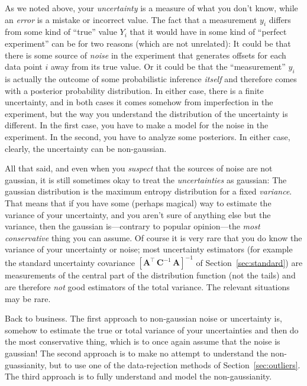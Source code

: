 \documentclass[12pt,twoside]{article}
\newcommand{\sectionname}{Section}
\newcommand{\mmatrix}[1]{\boldsymbol{#1}}
\newcommand{\inverse}[1]{{#1}^{-1}}
\newcommand{\transpose}[1]{{#1}^{\scriptscriptstyle \top}}
\newcommand{\mA}{\mmatrix{A}}
\newcommand{\mAT}{\transpose{\mA}}
\newcommand{\mC}{\mmatrix{C}}
\newcommand{\mCinv}{\inverse{\mC}}
\begin{document}
As we noted above, your \emph{uncertainty} is a measure of what you
don't know, while an \emph{error} is a mistake or incorrect value.
The fact that a measurement $y_i$ differs from some kind of ``true''
value $Y_i$ that it would have in some kind of ``perfect experiment''
can be for two reasons (which are not unrelated): It could be that
there is some source of \emph{noise} in the experiment that generates
offsets for each data point $i$ away from its true value.  Or it could
be that the ``measurement'' $y_i$ is actually the outcome of some
probabilistic inference \emph{itself} and therefore comes with a
posterior probability distribution.  In either case, there is a finite
uncertainty, and in both cases it comes somehow from imperfection in
the experiment, but the way you understand the distribution of the
uncertainty is different.  In the first case, you have to make a model
for the noise in the experiment.  In the second, you have to analyze
some posteriors.  In either case, clearly, the uncertainty can be
non-gaussian.

All that said, and even when you \emph{suspect} that the sources of
noise are not gaussian, it is still sometimes okay to treat the
\emph{uncertainties} as gaussian: The gaussian distribution is the
maximum entropy distribution for a fixed \emph{variance}.  That means
that if you have some (perhaps magical) way to estimate the variance
of your uncertainty, and you aren't sure of anything else but the
variance, then the gaussian is---contrary to popular opinion---the
\emph{most conservative} thing you can assume.  Of course it is very
rare that you do know the variance of your uncertainty or noise; most
uncertainty estimators (for example the standard uncertainty
covariance $\inverse{\left[\mAT\,\mCinv\,\mA\right]}$ of
\sectionname~\ref{sec:standard}) are measurements of the central part
of the distribution function (not the tails) and are therefore
\emph{not} good estimators of the total variance.  The relevant
situations may be rare.

Back to business.  The first approach to non-gaussian noise or
uncertainty is, somehow to estimate the true or total variance of your
uncertainties and then do the most conservative thing, which is to
once again assume that the noise is gaussian!  The second approach is
to make no attempt to understand the non-guassianity, but to use one
of the data-rejection methods of \sectionname~\ref{sec:outliers}.  The
third approach is to fully understand and model the non-gaussianity.
\end{document}
